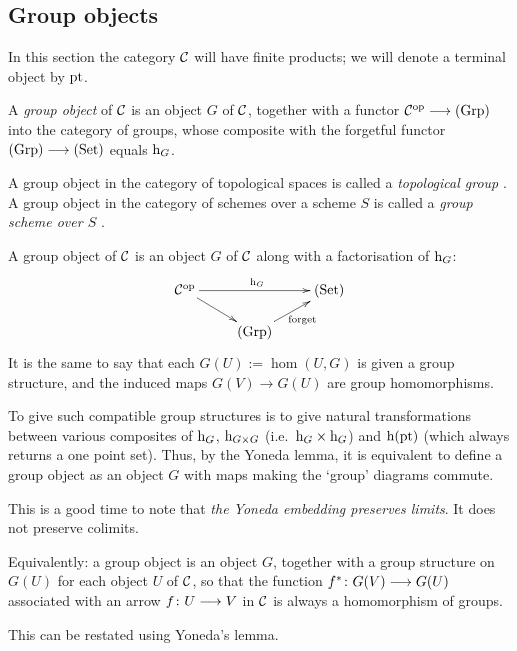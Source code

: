 \begin{2   CONTRAVARIANT FUNCTORS}
\begin{2.1 Yoneda Lemma}
\end{2.1 Yoneda Lemma}
\begin{2.2 Group objects}
\setcounter{section}{1}
\section{Group objects}\label{sec:group-objects}
\setcounter{theorem}{10}

In this section the category $\mathcal{C}$ will have finite products; we will denote a terminal object by $\mathrm{pt}$.

\begin{definition}
A \emph{group object}%
 of $\mathcal{C}$ is an object $G$ of $\mathcal{C}$, together with a functor $\cC\op \arr \catgrp$ into the category of groups, whose composite with the forgetful functor $\catgrp \arr \catset$ equals $\mathrm{h}_G$.

A group object in the category of topological spaces is called a \emph{topological group}%
. A group object in the category of schemes over a scheme $S$ is called a \emph{group scheme over $S$}%
.
\end{definition}
\begin{shaded}
A group object of $\mathcal{C}$ is an object $G$ of $\mathcal{C}$ along with a factorisation of $\mathrm{h}_G$:
\[\xymatrix@R=.5cm{
\ar[dr]\calC\op\ar[rr]^{\h_G}&&\catset\\
&\catgrp\ar[ru]_{\textup{forget}}
}\]
It is the same to say that each $G(U):=\hom(U,G)$ is given a group structure, and the induced maps $G(V)\to G(U)$ are group homomorphisms.

To give such compatible group structures is to give natural transformations between various composites of $\mathrm{h}_G$, $\mathrm{h}_{G\times G}$ (i.e.\ $\mathrm{h}_G\times \mathrm{h}_G$) and $\mathrm{h}(\mathrm{pt})$ (which always returns a one point set). Thus, by the Yoneda lemma, it is equivalent to define a group object as an object $G$ with maps making the `group' diagrams commute.

This is a good time to note that \emph{the Yoneda embedding preserves limits}. It does not preserve colimits.
\end{shaded}

Equivalently: a group object is an object $G$, together with a group structure on $G(U)$ for each object $U$ of $\mathcal{C}$, so that the function $f^* \colon G(V) \arr G(U)$ associated with an arrow $f \colon U \arr V$ in $\mathcal{C}$ is always a homomorphism of groups.

This can be restated using Yoneda's lemma.


\end{2.2 Group objects}
\end{2   CONTRAVARIANT FUNCTORS}
